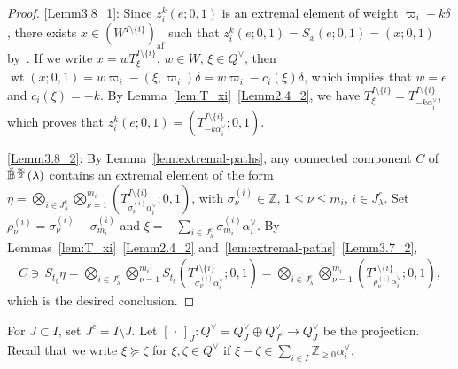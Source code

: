 \documentclass[10pt]{amsart}
\theoremstyle{definition}\newtheorem{defi}[theo]{Definition}
\theoremstyle{remark}\newtheorem{rema}[theo]{Remark}
\newcommand{\BZ}{\mathbb{Z}}
\newcommand{\si}{\frac{\infty}{2}}
\DeclareMathOperator{\af}{af}
\DeclareMathOperator{\wt}{wt}
\begin{document}
\begin{proof}
\ref{Lemm3.8_1}: 
Since 
$z_i^k(e;0,1)$
is an extremal element of weight $\varpi_i + k\delta$, 
there exists 
$x \in (W^{I \setminus \{ i \}})_{\af}$
such that 
$z_i^k(e;0,1) = S_x (e;0,1) = (x;0,1)$ 
by~\cite[Proposition~5.4~(i)]{K02}. 
If we write 
$x = wT^{I \setminus \{ i \}}_{\xi}$, 
$w \in W$, 
$\xi \in Q^{\vee}$, 
then 
$\wt (x;0,1) 
= w\varpi_i - (\xi,\varpi_i)\delta = w \varpi_i - c_i(\xi) \delta$, 
which implies that 
$w = e$
and 
$c_i(\xi) = -k$. 
By Lemma~\ref{lem:T_xi}~\ref{Lemm2.4_2}, 
we have 
$T^{I \setminus \{ i \}}_{\xi} = T^{I \setminus \{ i \}}_{-k\alpha_i^{\vee}}$, 
which proves that 
$z_i^k(e;0,1) = \left( T^{I \setminus \{ i \}}_{-k\alpha_i^{\vee}} ; 0,1 \right)$. 
 
\ref{Lemm3.8_2}: 
By Lemma~\ref{lem:extremal-paths}, 
any connected component $C$ of 
$\Breve{\mathbb{B}}^{\si}(\lambda)$
contains an extremal element of the form 
$\eta = \bigotimes_{i \in J_{\lambda}^c} 
\bigotimes_{\nu=1}^{m_i} \left(T^{I \setminus \{ i \}}_{\sigma^{(i)}_{\nu} \alpha_i^{\vee}} ;0,1 \right)$, 
with 
$\sigma^{(i)}_{\nu} \in \BZ$, $1 \leq \nu \leq m_i$, $i \in J_{\lambda}^c$. 
Set 
$\rho^{(i)}_{\nu} = \sigma^{(i)}_{\nu} - \sigma^{(i)}_{m_i}$ 
and 
$\xi = -\sum_{i \in J_{\lambda}^c} \sigma^{(i)}_{m_i} \alpha_i^{\vee}$. 
By Lemmas~\ref{lem:T_xi}~\ref{Lemm2.4_2} and~\ref{lem:extremal-paths}~\ref{Lemm3.7_2}, 
\begin{align}
C \ni \, 
S_{t_{\xi}} \eta 
= 
\bigotimes_{i \in J_{\lambda}^c} \bigotimes_{\nu = 1}^{m_i} 
S_{t_{\xi}} \left(T^{I \setminus \{ i \}}_{\sigma^{(i)}_{\nu} \alpha_i^{\vee}} ;0,1 \right)
=
\bigotimes_{i \in J_{\lambda}^c} \bigotimes_{\nu = 1}^{m_i} 
\left( T^{I \setminus \{ i \}}_{\rho^{(i)}_{\nu} \alpha_i^{\vee}} ; 0,1 \right) , 
\end{align}
which is the desired conclusion.
\end{proof}

For 
$J \subset I$, 
set
$J^c = I \setminus J$. 
Let 
$[ \, \cdot \, ]_J : Q^{\vee} = Q^{\vee}_J \oplus Q^{\vee}_{J^c} \rightarrow Q_J^{\vee}$
be the projection. 
Recall that we write
$\xi \succeq \zeta$
for 
$\xi , \zeta \in Q^{\vee}$ 
if 
$\xi - \zeta \in \sum_{i \in I} \BZ_{\geq 0} \alpha_i^{\vee}$.
\end{document}
